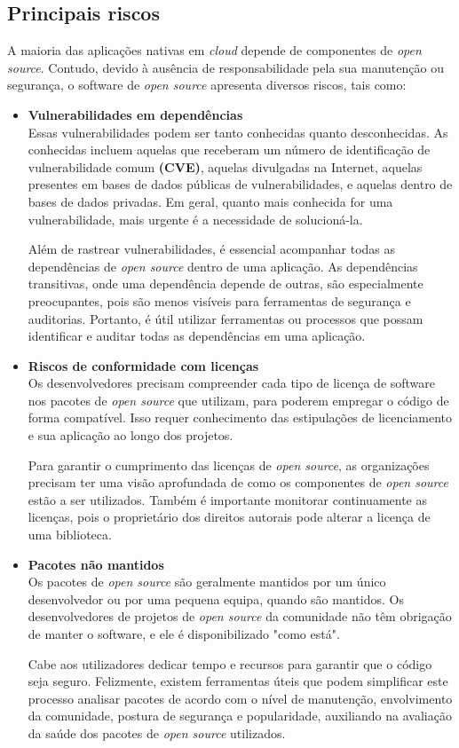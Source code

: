\subsection{Principais riscos}
A maioria das aplicações nativas em \textit{cloud} depende de componentes de \textit{open source}. Contudo, devido à ausência de responsabilidade pela sua manutenção ou segurança, o software de \textit{open source} apresenta diversos riscos, tais como:
\begin{itemize}

  \item \textbf{Vulnerabilidades em dependências}\\
  Essas vulnerabilidades podem ser tanto conhecidas quanto desconhecidas. As conhecidas incluem aquelas que receberam um número de identificação de vulnerabilidade comum \textbf{(CVE)}, aquelas divulgadas na Internet, aquelas presentes em bases de dados públicas de vulnerabilidades, e aquelas dentro de bases de dados privadas. Em geral, quanto mais conhecida for uma vulnerabilidade, mais urgente é a necessidade de solucioná-la.
  \par \vspace{6pt}
  Além de rastrear vulnerabilidades, é essencial acompanhar todas as dependências de \textit{open source} dentro de uma aplicação. As dependências transitivas, onde uma dependência depende de outras, são especialmente preocupantes, pois são menos visíveis para ferramentas de segurança e auditorias. Portanto, é útil utilizar ferramentas ou processos que possam identificar e auditar todas as dependências em uma aplicação.
  \item \textbf{Riscos de conformidade com licenças}\\
  Os desenvolvedores precisam compreender cada tipo de licença de software nos pacotes de \textit{open source} que utilizam, para poderem empregar o código de forma compatível. Isso requer conhecimento das estipulações de licenciamento e sua aplicação ao longo dos projetos. 
  \par \vspace{6pt}
  Para garantir o cumprimento das licenças de \textit{open source}, as organizações precisam ter uma visão aprofundada de como os componentes de \textit{open source} estão a ser utilizados. Também é importante monitorar continuamente as licenças, pois o proprietário dos direitos autorais pode alterar a licença de uma biblioteca.
  \item \textbf{Pacotes não mantidos}\\
  Os pacotes de \textit{open source} são geralmente mantidos por um único desenvolvedor ou por uma pequena equipa, quando são mantidos. Os desenvolvedores de projetos de \textit{open source} da comunidade não têm obrigação de manter o software, e ele é disponibilizado "como está". 
  \par \vspace{6pt}
  Cabe aos utilizadores dedicar tempo e recursos para garantir que o código seja seguro. Felizmente, existem ferramentas úteis que podem simplificar este processo analisar pacotes de acordo com o nível de manutenção, envolvimento da comunidade, postura de segurança e popularidade, auxiliando na avaliação da saúde dos pacotes de \textit{open source} utilizados. 
\end{itemize}